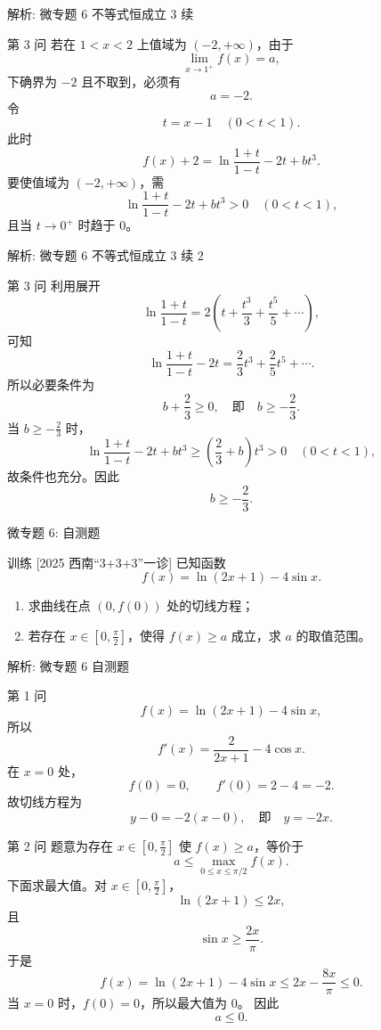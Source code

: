 ﻿\documentclass[aspectratio=169,10pt]{ctexbeamer}
\begin{document}
\begin{frame}[t,allowframebreaks]{解析: 微专题 6 不等式恒成立 3 续}
\tiny
\begin{block}{第 3 问}
若在 $1<x<2$ 上值域为 $(-2,+\infty)$，由于
\[
\lim_{x\to1^+}f(x)=a,
\]
下确界为 $-2$ 且不取到，必须有
\[
a=-2.
\]
令
\[
t=x-1\quad (0<t<1).
\]
此时
\[
f(x)+2=\ln\frac{1+t}{1-t}-2t+bt^3.
\]
要使值域为 $(-2,+\infty)$，需
\[
\ln\frac{1+t}{1-t}-2t+bt^3>0\quad (0<t<1),
\]
且当 $t\to0^+$ 时趋于 $0$。
\end{block}
\end{frame}

\begin{frame}[t,allowframebreaks]{解析: 微专题 6 不等式恒成立 3 续 2}
\tiny
\begin{block}{第 3 问}
利用展开
\[
\ln\frac{1+t}{1-t}=2\left(t+\frac{t^3}{3}+\frac{t^5}{5}+\cdots\right),
\]
可知
\[
\ln\frac{1+t}{1-t}-2t=\frac23t^3+\frac25t^5+\cdots.
\]
所以必要条件为
\[
b+\frac23\ge0,\quad 即\quad b\ge-\frac23.
\]
当 $b\ge-\frac23$ 时，
\[
\ln\frac{1+t}{1-t}-2t+bt^3
\ge \left(\frac23+b\right)t^3>0\quad (0<t<1),
\]
故条件也充分。因此
\[
b\ge-\frac23.
\]
\end{block}
\end{frame}

\begin{frame}[t]{微专题 6: 自测题}
\large
\begin{block}{训练}
[2025 西南“3+3+3”一诊] 已知函数
\[
f(x)=\ln(2x+1)-4\sin x.
\]
\begin{enumerate}
  \item 求曲线在点 $(0,f(0))$ 处的切线方程；
  \item 若存在 $x\in\left[0,\frac{\pi}{2}\right]$，使得 $f(x)\ge a$ 成立，求 $a$ 的取值范围。
\end{enumerate}
\end{block}
\end{frame}

\begin{frame}[t,allowframebreaks]{解析: 微专题 6 自测题}
\tiny
\begin{block}{第 1 问}
\[
f(x)=\ln(2x+1)-4\sin x,
\]
所以
\[
f'(x)=\frac2{2x+1}-4\cos x.
\]
在 $x=0$ 处，
\[
f(0)=0,\qquad f'(0)=2-4=-2.
\]
故切线方程为
\[
y-0=-2(x-0),\quad 即\quad y=-2x.
\]
\end{block}
\begin{block}{第 2 问}
题意为存在 $x\in[0,\frac\pi2]$ 使 $f(x)\ge a$，等价于
\[
a\le \max_{0\le x\le\pi/2}f(x).
\]
下面求最大值。对 $x\in[0,\frac\pi2]$，
\[
\ln(2x+1)\le2x,
\]
且
\[
\sin x\ge \frac{2x}{\pi}.
\]
于是
\[
f(x)=\ln(2x+1)-4\sin x
\le 2x-\frac{8x}{\pi}\le0.
\]
当 $x=0$ 时，$f(0)=0$，所以最大值为 $0$。
因此
\[
a\le0.
\]
\end{block}
\end{frame}
\end{document}
